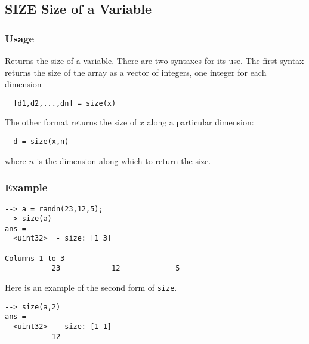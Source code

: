 %
%
%
\subsection{SIZE Size of a Variable}
\subsubsection{Usage}
Returns the size of a variable.  There are two syntaxes for its
use.  The first syntax returns the size of the array as a vector
of integers, one integer for each dimension
\begin{verbatim}
  [d1,d2,...,dn] = size(x)
\end{verbatim}
The other format returns the size of $x$ along a particular
dimension:
\begin{verbatim}
  d = size(x,n)
\end{verbatim}
where $n$ is the dimension along which to return the size.
\subsubsection{Example}
\begin{verbatim}
--> a = randn(23,12,5);
--> size(a)
ans =
  <uint32>  - size: [1 3]
  
Columns 1 to 3
           23            12             5
\end{verbatim}
Here is an example of the second form of \verb|size|.
\begin{verbatim}
--> size(a,2)
ans =
  <uint32>  - size: [1 1]
           12
\end{verbatim}
